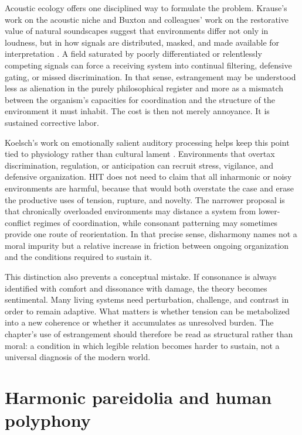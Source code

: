 Acoustic ecology offers one disciplined way to formulate the problem. Krause's work on the acoustic niche and Buxton and colleagues' work on the restorative value of natural soundscapes suggest that environments differ not only in loudness, but in how signals are distributed, masked, and made available for interpretation \parencite{krause_2013, buxton_2021}. A field saturated by poorly differentiated or relentlessly competing signals can force a receiving system into continual filtering, defensive gating, or missed discrimination. In that sense, estrangement may be understood less as alienation in the purely philosophical register and more as a mismatch between the organism's capacities for coordination and the structure of the environment it must inhabit. The cost is then not merely annoyance. It is sustained corrective labor.

Koelsch's work on emotionally salient auditory processing helps keep this point tied to physiology rather than cultural lament \parencite{koelsch_2014}. Environments that overtax discrimination, regulation, or anticipation can recruit stress, vigilance, and defensive organization. HIT does not need to claim that all inharmonic or noisy environments are harmful, because that would both overstate the case and erase the productive uses of tension, rupture, and novelty. The narrower proposal is that chronically overloaded environments may distance a system from lower-conflict regimes of coordination, while consonant patterning may sometimes provide one route of reorientation. In that precise sense, disharmony names not a moral impurity but a relative increase in friction between ongoing organization and the conditions required to sustain it.

This distinction also prevents a conceptual mistake. If consonance is always identified with comfort and dissonance with damage, the theory becomes sentimental. Many living systems need perturbation, challenge, and contrast in order to remain adaptive. What matters is whether tension can be metabolized into a new coherence or whether it accumulates as unresolved burden. The chapter's use of estrangement should therefore be read as structural rather than moral: a condition in which legible relation becomes harder to sustain, not a universal diagnosis of the modern world.

\section{Harmonic pareidolia and human polyphony}

